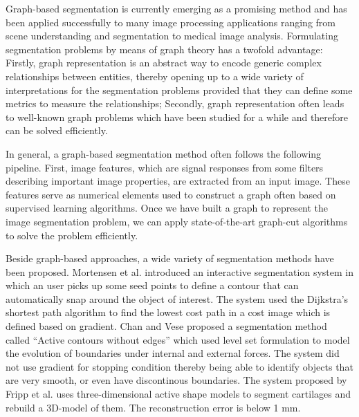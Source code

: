 \documentclass{SMBV13}
\begin{document}
Graph-based segmentation is currently emerging as a promising method and has been applied successfully to many image processing applications ranging from scene understanding and segmentation to medical image analysis. Formulating segmentation problems by means of graph theory has a twofold advantage: Firstly, graph representation is an abstract way to encode generic complex relationships between entities, thereby opening up to a wide variety of interpretations for the segmentation problems provided that they can define some metrics to measure the relationships; Secondly, graph representation often leads to well-known graph problems which have been studied for a while and therefore can be solved efficiently.

In general, a graph-based segmentation method often follows the following pipeline. First, image features, which are signal responses from some filters describing important image properties, are extracted from an input image. These features serve as numerical elements used to construct a graph often based on supervised learning algorithms. Once we have built a graph to represent the image segmentation problem, we can apply state-of-the-art graph-cut algorithms to solve the problem efficiently. 

Beside graph-based approaches, a wide variety of segmentation methods have been proposed. Mortensen et al. \cite{mortensen1995intelligent} introduced an interactive segmentation system in which an user picks up some seed points to define a contour that can automatically snap around the object of interest. The system used the Dijkstra's shortest path algorithm to find the lowest cost path in a cost image which is defined based on gradient. Chan and Vese proposed a segmentation method called ``Active contours without edges'' \cite{chan2001active} which used level set formulation to model the evolution of boundaries under internal and external forces. The system did not use gradient for stopping condition thereby being able to identify objects that are very smooth, or even have discontinous boundaries. The system proposed by Fripp et al. \cite{fripp2007automatic} uses three-dimensional active shape models to segment cartilages and rebuild a 3D-model of them. The reconstruction error is below 1 mm.
\end{document}
